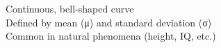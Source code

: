 \documentclass[preview]{standalone}
\begin{document}
Continuous, bell-shaped curve\\Defined by mean (μ) and standard deviation (σ)\\Common in natural phenomena (height, IQ, etc.)\\
\end{document}
